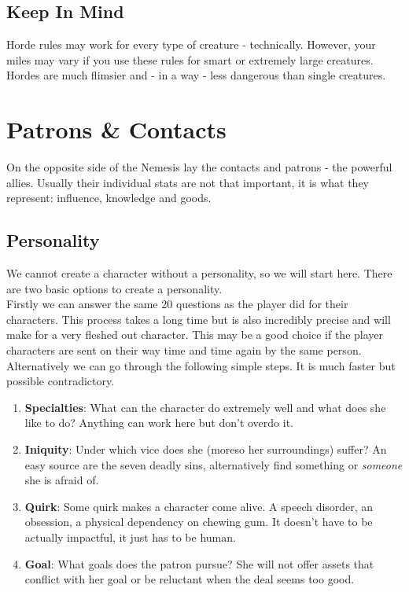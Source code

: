 \documentclass[12pt,a4paper,openany]{book}
\begin{document}
	\section*{Keep In Mind}
	Horde rules may work for every type of creature - technically. However, your miles may vary if you use these rules for smart or extremely large creatures. Hordes are much flimsier and - in a way - less dangerous than single creatures.

	\chapter{Patrons \& Contacts}
	On the opposite side of the Nemesis lay the contacts and patrons - the powerful allies. Usually their individual stats are not that important, it is what they represent: influence, knowledge and goods.
	\section*{Personality}
	We cannot create a character without a personality, so we will start here. There are two basic options to create a personality.\\
	Firstly we can answer the same 20 questions as the player did for their characters. This process takes a long time but is also incredibly precise and will make for a very fleshed out character. This may be a good choice if the player characters are sent on their way time and time again by the same person.
	Alternatively we can go through the following simple steps. It is much faster but possible contradictory.
	\begin{enumerate}
		\setlength\itemsep{-8mm} \vspace{-8mm}
		\item \textbf{Specialties}: What can the character do extremely well and what does she like to do? Anything can work here but don't overdo it.
		\item \textbf{Iniquity}: Under which vice does she (moreso her surroundings) suffer? An easy source are the seven deadly sins, alternatively find something or \emph{someone} she is afraid of.
		\item \textbf{Quirk}: Some quirk makes a character come alive. A speech disorder, an obsession, a physical dependency on chewing gum. It doesn't have to be actually impactful, it just has to be human.
		\item \textbf{Goal}: What goals does the patron pursue? She will not offer assets that conflict with her goal or be reluctant when the deal seems too good.
	\end{enumerate}
\end{document}
